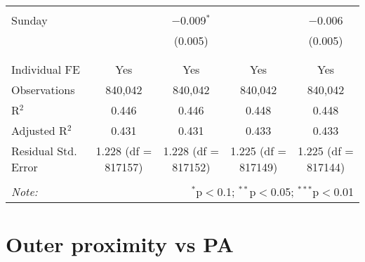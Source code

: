 \documentclass[
]{article}
\begin{document}
\begin{table}[!htbp]
{\begin{tabular}{@{\extracolsep{5pt}}lcccc}
  & & & & \\ 
 Sunday &  & $-$0.009$^{*}$ &  & $-$0.006 \\ 
  &  & (0.005) &  & (0.005) \\ 
  & & & & \\ 
\hline \\[-1.8ex] 
Individual FE & Yes & Yes & Yes & Yes \\ 
Observations & 840,042 & 840,042 & 840,042 & 840,042 \\ 
R$^{2}$ & 0.446 & 0.446 & 0.448 & 0.448 \\ 
Adjusted R$^{2}$ & 0.431 & 0.431 & 0.433 & 0.433 \\ 
Residual Std. Error & 1.228 (df = 817157) & 1.228 (df = 817152) & 1.225 (df = 817149) & 1.225 (df = 817144) \\ 
\hline 
\hline \\[-1.8ex] 
\textit{Note:}  & \multicolumn{4}{r}{$^{*}$p$<$0.1; $^{**}$p$<$0.05; $^{***}$p$<$0.01} \\ 
\end{tabular}
} 
\end{table} 
\newpage
\section{Outer proximity vs PA}
\end{document}
